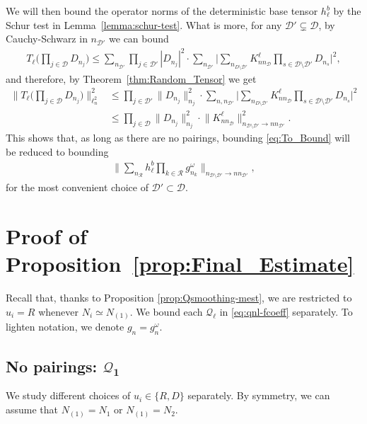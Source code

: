 \documentclass[11pt, xcolor = dvipsnames,reqno
]{amsart}
\theoremstyle{definition}
\theoremstyle{remark}
\begin{document}
We will then bound the operator norms of the deterministic base tensor $h_\ell^b$ by the Schur test in Lemma~\ref{lemma:schur-test}.  
%
What is more, for any $\mathcal{D}' \subsetneq \mathcal{D}$, by Cauchy-Schwarz in $n_{\mathcal D'}$ we can bound
\begin{align}
    T_\ell \Big( \prod_{j \in \mathcal D} D_{n_j} \Big) 
    \leq 
    \sum_{n_{\mathcal D'}} 
    \prod_{j \in \mathcal D'} |D_{n_j}|^2 
    \cdot 
    \sum_{n_{\mathcal D'}}
    \Big| 
    \sum_{n_{D \setminus \mathcal D'}} K^\ell_{nn_{\mathcal D}} \prod_{s \in \mathcal D \setminus \mathcal D'} D_{n_s} 
    \Big|^2, 
\end{align}
and therefore, by Theorem~\ref{thm:Random_Tensor} we get
\begin{align}
    \Big\lVert T_\ell \Big( \prod_{j \in \mathcal D} D_{n_j} \Big) \Big\rVert_{\ell_n^2}^2 
    & \leq 
    \prod_{j \in \mathcal D'} \lVert D_{n_j}\rVert_{n_j}^2
    \cdot 
    \sum_{n, n_{\mathcal D'}}
    \Big| 
    \sum_{n_{D \setminus \mathcal D'}} K^\ell_{nn_{\mathcal D}} \prod_{s \in \mathcal D \setminus \mathcal D'} D_{n_s} 
    \Big|^2 \\
    & \leq
    \prod_{j \in \mathcal D} \lVert D_{n_j}\rVert_{n_j}^2
    \cdot 
    \lVert K^\ell_{nn_{\mathcal D}} \rVert_{n_{\mathcal D \setminus \mathcal D'} \to nn_{\mathcal D'}}^2.
\end{align}
This shows that, as long as there are no pairings, 
bounding \eqref{eq:To_Bound} will be reduced 
to bounding 
\begin{align}
    \bigg\| \sum_{n_\mathcal{R}} h^b_\ell \prod_{k \in \mathcal{R}} g_{n_{k}}^{\omega} \bigg\|_{n_{\mathcal{D} \setminus \mathcal{D}'} \rightarrow n n_{\mathcal{D}'}},
\end{align}
for the most convenient choice of $\mathcal D' \subset \mathcal D$.





\section{Proof of Proposition~\ref{prop:Final_Estimate}}
\label{sec:proof-smoothing}

Recall that, thanks to Proposition \ref{prop:Qsmoothing-mest}, we are restricted to $u_i = R$ whenever $N_i \simeq N_{(1)}$.
We bound each $\mathcal{Q}_\ell$ in \eqref{eq:qnl-fcoeff} separately. To lighten notation, we denote $g_n = g_n^{\omega}$.


\subsection{No pairings: $\boldsymbol{\mathcal{Q}_1}$}
We study different choices of $u_i \in \{R,D\}$ separately.
By symmetry, we can assume that $N_{(1)} = N_1$ or $N_{(1)} = N_2$. 
\end{document}
